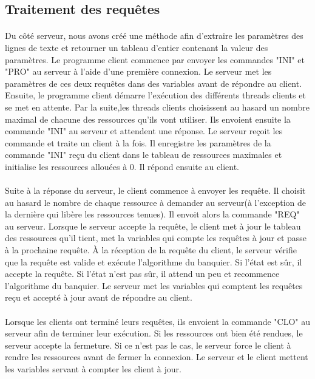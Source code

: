 \documentclass{article}
\begin{document}
\subsection{Traitement des requêtes}

\paragraph{}
Du côté serveur, nous avons créé une méthode afin d'extraire les paramètres des lignes 
de texte et retourner un tableau d'entier contenant la valeur des paramètres. Le 
programme client commence par envoyer les commandes "INI" et "PRO" au serveur à 
l'aide d'une première connexion. Le serveur met les paramètres de ces deux requêtes dans
des variables avant de répondre au client. Ensuite, le programme client démarre l'exécution 
des différents threads clients et se met en attente. Par la suite,les threads clients 
choisissent au hasard un nombre maximal de chacune des ressources qu'ils vont utiliser. 
Ils envoient ensuite la commande "INI" au serveur et attendent une réponse. Le serveur 
reçoit les commande et traite un client à la fois. Il enregistre les paramètres de la 
commande "INI" reçu du client dans le tableau de ressources maximales et initialise les 
ressources allouées à 0. Il répond ensuite au client. 

\paragraph{}
Suite à la réponse du serveur, le client commence à envoyer les requête. Il choisit au 
hasard le nombre de chaque ressource à demander au serveur(à l'exception de la dernière 
qui libère les ressources tenues). Il envoit alors la commande "REQ" au serveur. Lorsque 
le serveur accepte la requête, le client met à jour le tableau des ressources qu'il tient, 
met la variables qui compte les requêtes à jour  
et passe à la prochaine requête. À la réception de la requête du client, le serveur vérifie 
que la requête est valide et exécute l'algorithme du banquier. Si l'état est sûr, il accepte 
la requête. Si l'état n'est pas sûr, il attend un peu et recommence l'algorithme du banquier.
Le serveur met les variables qui comptent les requêtes reçu et accepté à jour avant de répondre 
au client.

\paragraph{}
Lorsque les clients ont terminé leurs requêtes, ils envoient la commande "CLO" au serveur 
afin de terminer leur exécution. Si les ressources ont bien été rendues, le serveur accepte 
la fermeture. Si ce n'est pas le cas, le serveur force le client à rendre les ressources avant 
de fermer la connexion. Le serveur et le client mettent les variables servant à compter les 
client à jour.
\end{document}

